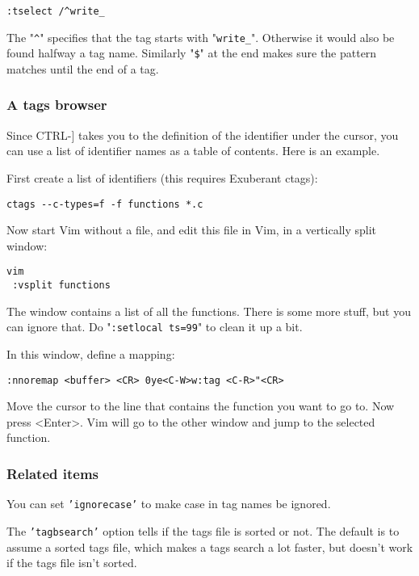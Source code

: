 \begin{Verbatim}[samepage=true]
 :tselect /^write_
\end{Verbatim}

The "\texttt{\^{}}" specifies that the tag starts with "\texttt{write\_}".
Otherwise it would also be found halfway a tag name.
Similarly "\texttt{\$}" at the end makes sure the pattern matches until the end of a tag.
\subsubsection{A tags browser}
Since CTRL-] takes you to the definition of the identifier under the cursor, you can use a list of identifier names as a table of contents.
Here is an example.

First create a list of identifiers (this requires Exuberant ctags):

\begin{Verbatim}[samepage=true]
 ctags --c-types=f -f functions *.c
\end{Verbatim}

Now start Vim without a file, and edit this file in Vim, in a vertically split window:

\begin{Verbatim}[samepage=true]
 vim
 :vsplit functions
\end{Verbatim}

The window contains a list of all the functions.
There is some more stuff, but you can ignore that.
Do "\texttt{:setlocal ts=99}" to clean it up a bit.

In this window, define a mapping:

\begin{Verbatim}[samepage=true]
 :nnoremap <buffer> <CR> 0ye<C-W>w:tag <C-R>"<CR>
\end{Verbatim}

Move the cursor to the line that contains the function you want to go to.
Now press <Enter>.
Vim will go to the other window and jump to the selected function.
\subsubsection{Related items}
You can set \texttt{'ignorecase'} to make case in tag names be ignored.

The \texttt{'tagbsearch'} option tells if the tags file is sorted or not.
The default is to assume a sorted tags file, which makes a tags search a lot faster, but doesn't work if the tags file isn't sorted.

